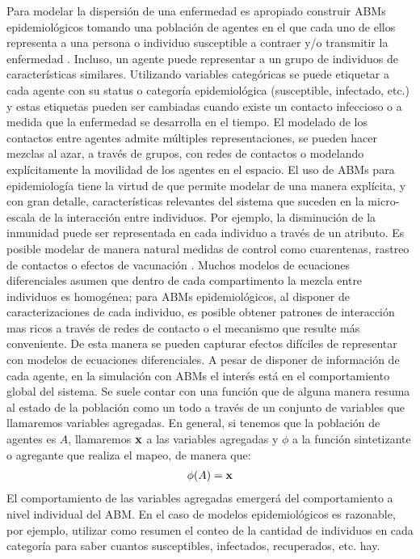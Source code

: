 Para modelar la dispersión de una enfermedad es apropiado construir ABMs epidemiológicos tomando una población de agentes en el que cada uno de ellos representa a una persona o individuo susceptible a contraer y/o transmitir la enfermedad \citep{Roche2011}. Incluso, un agente puede representar a un grupo de individuos de características similares. Utilizando variables categóricas se puede etiquetar a cada agente con su status o categoría epidemiológica (susceptible, infectado, etc.) y estas etiquetas pueden ser cambiadas cuando existe un contacto infeccioso o a medida que la enfermedad se desarrolla en el tiempo. El modelado de los contactos entre agentes admite múltiples representaciones, se pueden hacer mezclas al azar, a través de grupos, con redes de contactos o modelando explícitamente la movilidad de los agentes en el espacio. El uso de ABMs para epidemiología tiene la virtud de que permite modelar de una manera explícita, y con gran detalle, características relevantes del sistema que suceden en la micro-escala de la interacción entre individuos. Por ejemplo, la disminución de la inmunidad puede ser representada en cada individuo a través de un atributo. Es posible modelar de manera natural medidas de control como cuarentenas, rastreo de contactos o efectos de vacunación \citep{Silva2020}. Muchos modelos de ecuaciones diferenciales asumen que dentro de cada compartimento la mezcla entre individuos es homogénea; para ABMs epidemiológicos, al disponer de caracterizaciones de cada individuo, es posible obtener patrones de interacción mas ricos a través de redes de contacto o el mecanismo que resulte más conveniente. De esta manera se pueden capturar efectos difíciles de representar con modelos de ecuaciones diferenciales. A pesar de disponer de información de cada agente, en la simulación con ABMs el interés está en el comportamiento global del sistema. Se suele contar con una función que de alguna manera resuma al estado de la población como un todo a través de un conjunto de variables que llamaremos variables agregadas. En general, si tenemos que la población de agentes es $A$, llamaremos $\mathbf{x}$ a las variables agregadas y $\phi$ a la función sintetizante o agregante que realiza el mapeo, de manera que:
\begin{align}
    \phi (A) = \mathbf{x}
\end{align}
El comportamiento de las variables agregadas emergerá del comportamiento a nivel individual del ABM. En el caso de modelos epidemiológicos es razonable, por ejemplo, utilizar como resumen el conteo de la cantidad de individuos en cada categoría para saber cuantos susceptibles, infectados, recuperados, etc. hay.

